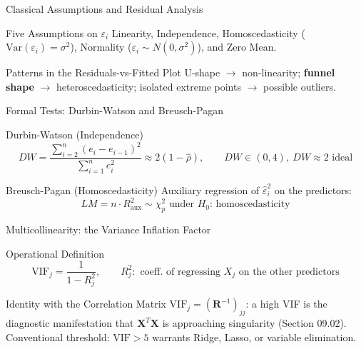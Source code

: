 \documentclass[10pt, aspectratio=169]{beamer}
\begin{document}
\begin{frame}{Classical Assumptions and Residual Analysis}
  \footnotesize
  \begin{block}{Five Assumptions on $\varepsilon_i$}
    Linearity, Independence, Homoscedasticity ($\text{Var}(\varepsilon_i)=\sigma^2$), Normality ($\varepsilon_i\sim N(0,\sigma^2)$), and Zero Mean.
  \end{block}
  \pause

  \vspace{0.1cm}
  \begin{alertblock}{Patterns in the Residuals-vs-Fitted Plot}
    U-shape $\to$ non-linearity; \textbf{funnel shape} $\to$ heteroscedasticity; isolated extreme points $\to$ possible outliers.
  \end{alertblock}
\end{frame}

\begin{frame}{Formal Tests: Durbin-Watson and Breusch-Pagan}
  \footnotesize
  \begin{block}{Durbin-Watson (Independence)}
    $$DW=\frac{\sum_{i=2}^n(e_i-e_{i-1})^2}{\sum_{i=1}^n e_i^2}\approx2(1-\hat\rho), \qquad DW\in(0,4),\ DW\approx2 \text{ ideal}$$
  \end{block}
  \pause

  \vspace{0.1cm}
  \begin{alertblock}{Breusch-Pagan (Homoscedasticity)}
    Auxiliary regression of $\hat\varepsilon_i^2$ on the predictors: $$LM=n\cdot R_{\text{aux}}^2 \sim \chi^2_p \text{ under } H_0\text{: homoscedasticity}$$
  \end{alertblock}
\end{frame}

\begin{frame}{Multicollinearity: the Variance Inflation Factor}
  \footnotesize
  \begin{block}{Operational Definition}
    $$\text{VIF}_j=\frac{1}{1-R_j^2}, \qquad R_j^2: \text{ coeff. of regressing } X_j \text{ on the other predictors}$$
  \end{block}
  \pause

  \vspace{0.1cm}
  \begin{alertblock}{Identity with the Correlation Matrix}
    $\text{VIF}_j=(\mathbf{R}^{-1})_{jj}$: a high VIF is the diagnostic manifestation that $\mathbf{X}^T\mathbf{X}$ is approaching singularity (Section 09.02). Conventional threshold: $\text{VIF}>5$ warrants Ridge, Lasso, or variable elimination.
  \end{alertblock}
\end{frame}
\end{document}
